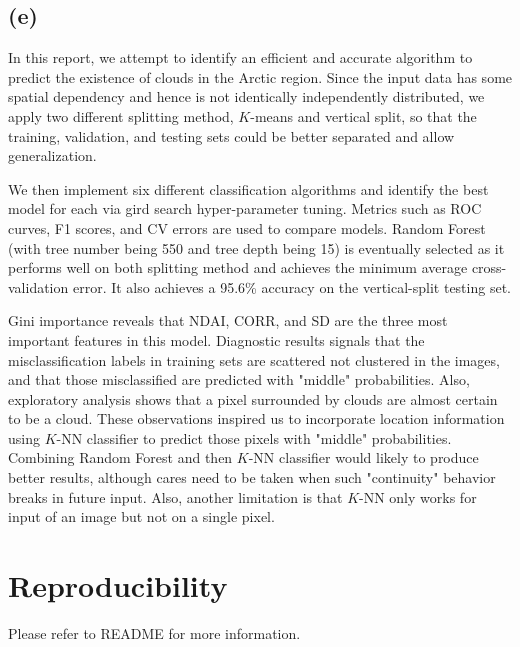 \documentclass[11pt]{article}
\theoremstyle{definition}
\begin{document}
\subsection*{(e)}
In this report, we attempt to identify an efficient and accurate algorithm to predict the existence of clouds in the Arctic region. Since the input data has some spatial dependency and hence is not identically independently distributed, we apply two different splitting method, $K$-means and vertical split, so that the training, validation, and testing sets could be better separated and allow generalization.

We then implement six different classification algorithms and identify the best model for each via gird search hyper-parameter tuning. Metrics such as ROC curves, F1 scores, and CV errors are used to compare models. Random Forest (with tree number being 550 and tree depth being 15) is eventually selected as it performs well on both splitting method and achieves the minimum average cross-validation error. It also achieves a 95.6\% accuracy on the vertical-split testing set.

Gini importance reveals that NDAI, CORR, and SD are the three most important features in this model. Diagnostic results signals that the misclassification labels in training sets are scattered not clustered in the images, and that those misclassified are predicted with "middle" probabilities. Also, exploratory analysis shows that a pixel surrounded by clouds are almost certain to be a cloud. These observations inspired us to incorporate location information using $K$-NN classifier to predict those pixels with "middle" probabilities. Combining Random Forest and then $K$-NN classifier would likely to produce better results, although cares need to be taken when such "continuity" behavior breaks in future input. Also, another limitation is that $K$-NN only works for input of an image but not on a single pixel.

\section{Reproducibility}
Please refer to README for more information.
\end{document}
